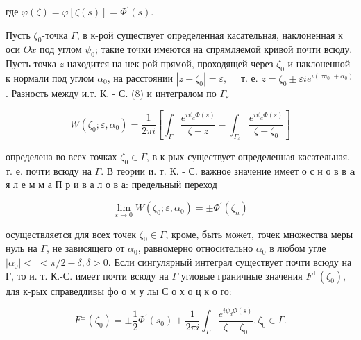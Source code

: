 \documentclass[10pt]{article}
\begin{document}
где $\varphi(\zeta)=\varphi[\zeta(s)]=\Phi^{\prime}(s)$.



Пусть $\zeta_{0}$-точка $\Gamma$, в к-рой существует определенная касательная, наклоненная к оси $O x$ под углом $\psi_{0}$; такие точки имеются на спрямляемой кривой почти всюду. Пусть точка $z$ находится на нек-рой прямой, проходящей через $\zeta_{0}$ и наклоненной к нормали под углом $\alpha_{0}$, на расстоянии $\left|z-\zeta_{0}\right|=\varepsilon, \quad$ т. е. $z=\zeta_{0} \pm \varepsilon i e^{i\left(\varpi_{0}+\alpha_{0}\right)}$. Разность между и.т. К. - С. (8) и интегралом по $\Gamma_{\varepsilon}$



\[

W\left(\zeta_{0} ; \varepsilon, \alpha_{0}\right)=\frac{1}{2 \pi i}\left[\int_{\Gamma} \frac{e^{i \psi_{d} \Phi(s)}}{\zeta-z}-\int_{\Gamma_{\varepsilon}} \frac{e^{i \psi_{d} \Phi(s)}}{\zeta-\zeta_{0}}\right]

\]



определена во всех точках $\zeta_{0} \in \Gamma$, в к-рых существует определенная касательная, т. е. почти всюду на $\Gamma$. В теории и. т. К. - С. важное значение имеет о с н о в в $\mathbf{a}$ я л е м м а П р и в а л о в а: предельный переход



\[

\lim _{\varepsilon \rightarrow 0} W\left(\zeta_{0} ; \varepsilon, \alpha_{0}\right)= \pm \Phi^{\prime}\left(\zeta_{n}\right)

\]



осуществляется для всех точек $\zeta_{0} \in \Gamma$, кроме, быть может, точек множества меры нуль на $\Gamma$, не зависящего от $\alpha_{0}$, равномерно относительно $\alpha_{0}$ в любом угле $\left|\alpha_{0}\right|<$ $<\pi / 2-\delta, \delta>0$. Если сингулярный интеграл существует почти всюду на Г, то и. т. К.-С. имеет почти всюду на $\Gamma$ угловые граничные значения $F^{ \pm}\left(\zeta_{0}\right)$, для к-рых справедливы фо о м у лы С о х о ц к о го:



\[

F^{ \pm}\left(\zeta_{0}\right)= \pm \frac{1}{2} \Phi^{\prime}\left(s_{0}\right)+\frac{1}{2 \pi i} \int_{\Gamma} \frac{e^{i \psi_{d} \Phi(s)}}{\zeta-\zeta_{0}}, \zeta_{0} \in \Gamma .

\]
\end{document}

